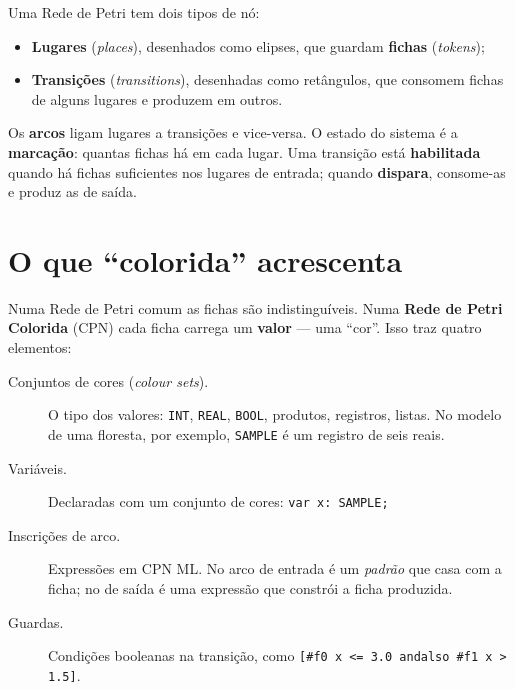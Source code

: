\documentclass[11pt,a4paper]{report}
\newcommand{\code}[1]{\texttt{\small #1}}
\begin{document}
Uma Rede de Petri tem dois tipos de nó:

\begin{itemize}
  \item \textbf{Lugares} (\emph{places}), desenhados como elipses, que guardam
        \textbf{fichas} (\emph{tokens});
  \item \textbf{Transições} (\emph{transitions}), desenhadas como retângulos,
        que consomem fichas de alguns lugares e produzem em outros.
\end{itemize}

Os \textbf{arcos} ligam lugares a transições e vice-versa. O estado do sistema
é a \textbf{marcação}: quantas fichas há em cada lugar. Uma transição está
\textbf{habilitada} quando há fichas suficientes nos lugares de entrada;
quando \textbf{dispara}, consome-as e produz as de saída.

\begin{center}
\end{center}

\section{O que ``colorida'' acrescenta}

Numa Rede de Petri comum as fichas são indistinguíveis. Numa
\textbf{Rede de Petri Colorida} (CPN) cada ficha carrega um \textbf{valor} ---
uma ``cor''. Isso traz quatro elementos:

\begin{description}
  \item[Conjuntos de cores (\emph{colour sets}).] O tipo dos valores:
        \code{INT}, \code{REAL}, \code{BOOL}, produtos, registros, listas. No
        modelo de uma floresta, por exemplo, \code{SAMPLE} é um registro de
        seis reais.
  \item[Variáveis.] Declaradas com um conjunto de cores:
        \code{var x: SAMPLE;}
  \item[Inscrições de arco.] Expressões em CPN ML. No arco de entrada é um
        \emph{padrão} que casa com a ficha; no de saída é uma expressão que
        constrói a ficha produzida.
  \item[Guardas.] Condições booleanas na transição, como
        \code{[\#f0 x <= 3.0 andalso \#f1 x > 1.5]}.
\end{description}
\end{document}
